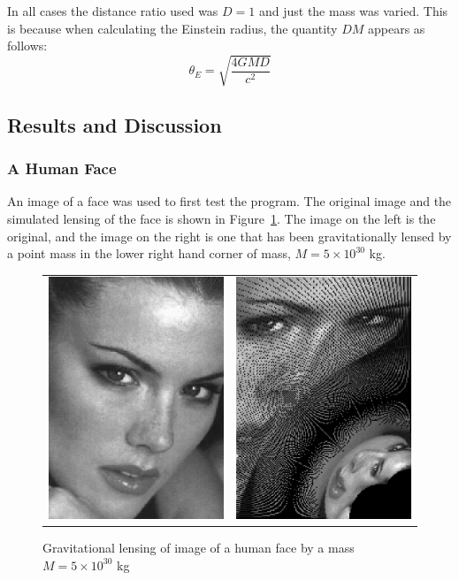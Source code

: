 \documentclass[a4paper]{IEEEtran}
\begin{document}
    In all cases the distance ratio used was $D = 1$ and just the mass
    was varied. This is because when calculating the Einstein radius,
    the quantity $DM$ appears as follows:
    \begin{equation}
        \theta_E = \sqrt{\frac{4GMD}{c^2}}
    \end{equation}

\subsection{Results and Discussion}

\subsubsection{A Human Face}
An image of a face was used to first test the program. 
The original image and the simulated lensing of the face is shown
in Figure~\ref{fig:face}.  The image on the
left is the original, and the image on the right is one that has been
gravitationally lensed by a point mass in the lower right hand corner
of mass, $M = 5 \times 10^{30}$ kg.

\begin{figure}
    \caption{Gravitational lensing of image of a human face by a mass $M = 5 \times 10^{30}$ kg} 
    \label{fig:face} 
    \begin{center}
    \begin{tabular}{cc}
        \includegraphics[width=0.4\columnwidth]{pics/kr.eps} &
        \includegraphics[width=0.4\columnwidth]{pics/kr_5e30.eps} \\
    \end{tabular}
    \end{center}
\end{figure} 
\end{document}
